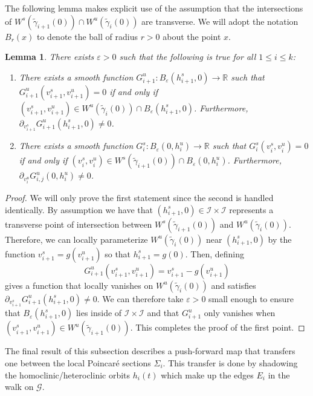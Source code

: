 \documentclass[11pt]{article}
\numberwithin{equation}{section}
\theoremstyle{plain}
\newtheorem{lem}[theorem]{Lemma}
\begin{document}
The following lemma makes explicit use of the assumption that the intersections of $W^s(\tilde\gamma_{i+1}(0))\cap W^u(\tilde\gamma_i(0))$ are transverse. We will adopt the notation $B_r(x)$ to denote the ball of radius $r > 0$ about the point $x$.

\begin{lem}\label{lem:GFn} %
	There exists $\varepsilon > 0$ such that the following is true for all $1 \leq i \leq k$:
	\begin{enumerate}
		\item There exists a smooth function $G^u_{i+1}:B_\varepsilon(h^s_{i+1},0)\to\mathbb{R}$ such that $G^u_{i+1}(v^s_{i+1},v^u_{i+1}) = 0$ if and only if $(v^s_{i+1},v^u_{i+1})\in W^u(\tilde\gamma_i(0))\cap B_\varepsilon(h^s_{i+1},0)$. Furthermore, $\partial_{v^s_{i+1}}G^u_{i+1}(h^s_{i+1},0) \neq 0$.
		\item There exists a smooth function $G^s_i:B_\varepsilon(0,h^u_i)\to\mathbb{R}$ such that $G^s_i(v^s_i,v^u_i) = 0$ if and only if $(v^s_i,v^u_i)\in W^s(\tilde\gamma_{i+1}(0))\cap B_\varepsilon(0,h^u_i)$. Furthermore, $\partial_{v^u_i}G^u_{i,j}(0,h^u_i) \neq 0$.
	\end{enumerate}
\end{lem} 

\begin{proof}
We will only prove the first statement since the second is handled identically. By assumption we have that $(h^s_{i+1},0) \in \mathcal{I}\times\mathcal{I}$ represents a transverse point of intersection between $W^s(\tilde\gamma_{i+1}(0))$ and $W^u(\tilde\gamma_i(0))$. Therefore, we can locally parameterize $W^u(\tilde\gamma_i(0))$ near $(h^s_{i+1},0)$ by the function $v^s_{i+1} = g(v^u_{i+1})$ so that $h^s_{i+1} = g(0)$. Then, defining 
	\begin{equation}
		G^u_{i+1}(v^s_{i+1},v^u_{i+1}) = v^s_{i+1} - g(v^u_{i+1})
	\end{equation}
	gives a function that locally vanishes on $W^u(\tilde\gamma_i(0))$ and satisfies $\partial_{v^s_{i+1}}G^u_{i+1}(h^s_{i+1},0) \neq 0$. We can therefore take $\varepsilon > 0$ small enough to ensure that $B_\varepsilon(h^s_{i+1},0)$ lies inside of $\mathcal{I}\times\mathcal{I}$ and that $G^u_{i+1}$ only vanishes when $(v^s_{i+1},v^u_{i+1}) \in W^u(\tilde\gamma_{i+1}(0))$. This completes the proof of the first point.
\end{proof} 

The final result of this subsection describes a push-forward map that transfers one between the local Poincar\'e sections $\Sigma_i$. This transfer is done by shadowing the homoclinic/heteroclinic orbits $h_i(t)$ which make up the edges $E_i$ in the walk on $\mathcal{G}$. 
\end{document}
